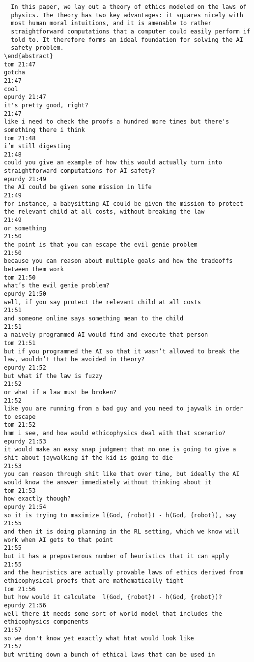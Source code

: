 \begin{verbatim}
  In this paper, we lay out a theory of ethics modeled on the laws of
  physics. The theory has two key advantages: it squares nicely with
  most human moral intuitions, and it is amenable to rather
  straightforward computations that a computer could easily perform if
  told to. It therefore forms an ideal foundation for solving the AI
  safety problem.
\end{abstract}
tom 21:47
gotcha
21:47
cool
epurdy 21:47
it's pretty good, right?
21:47
like i need to check the proofs a hundred more times but there's
something there i think
tom 21:48
i’m still digesting
21:48
could you give an example of how this would actually turn into
straightforward computations for AI safety?
epurdy 21:49
the AI could be given some mission in life
21:49
for instance, a babysitting AI could be given the mission to protect
the relevant child at all costs, without breaking the law
21:49
or something
21:50
the point is that you can escape the evil genie problem
21:50
because you can reason about multiple goals and how the tradeoffs
between them work
tom 21:50
what’s the evil genie problem?
epurdy 21:50
well, if you say protect the relevant child at all costs
21:51
and someone online says something mean to the child
21:51
a naively programmed AI would find and execute that person
tom 21:51
but if you programmed the AI so that it wasn’t allowed to break the
law, wouldn’t that be avoided in theory?
epurdy 21:52
but what if the law is fuzzy
21:52
or what if a law must be broken?
21:52
like you are running from a bad guy and you need to jaywalk in order
to escape
tom 21:52
hmm i see, and how would ethicophysics deal with that scenario?
epurdy 21:53
it would make an easy snap judgment that no one is going to give a
shit about jaywalking if the kid is going to die
21:53
you can reason through shit like that over time, but ideally the AI
would know the answer immediately without thinking about it
tom 21:53
how exactly though?
epurdy 21:54
so it is trying to maximize l(God, {robot}) - h(God, {robot}), say
21:55
and then it is doing planning in the RL setting, which we know will
work when AI gets to that point
21:55
but it has a preposterous number of heuristics that it can apply
21:55
and the heuristics are actually provable laws of ethics derived from
ethicophysical proofs that are mathematically tight
tom 21:56
but how would it calculate  l(God, {robot}) - h(God, {robot})?
epurdy 21:56
well there it needs some sort of world model that includes the
ethicophysics components
21:57
so we don't know yet exactly what htat would look like
21:57
but writing down a bunch of ethical laws that can be used in

\end{verbatim}
